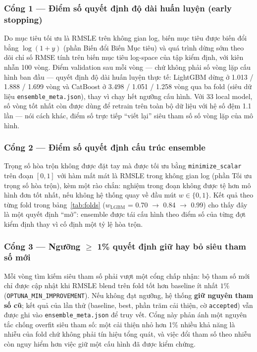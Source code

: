 \documentclass[12pt,a4paper]{report}
\begin{document}
\subsubsection{Cổng 1 --- Điểm số quyết định độ dài huấn luyện (early stopping)}
Do mục tiêu tối ưu là RMSLE trên không gian log, biến mục tiêu được biến đổi bằng
$\log(1+y)$ (phần Biến đổi Biến Mục tiêu) và quá trình dừng sớm theo dõi chỉ số RMSE
tính trên biến mục tiêu log-space của tập kiểm định, với kiên nhẫn 100 vòng. Điểm
validation sau mỗi vòng --- chứ không phải số vòng lặp cấu hình ban đầu --- quyết định
độ dài huấn luyện thực tế: LightGBM dừng ở 1.013 / 1.888 / 1.699 vòng và CatBoost ở
3.498 / 1.051 / 1.258 vòng qua ba fold (siêu dữ liệu \texttt{ensemble\_meta.json}), thay
vì chạy hết ngưỡng cấu hình. Với 33 local model, số vòng tốt nhất còn được dùng để
retrain trên toàn bộ dữ liệu với hệ số đệm 1.1 lần --- nói cách khác, điểm số trực tiếp
``viết lại'' siêu tham số số vòng lặp của mô hình.

\subsubsection{Cổng 2 --- Điểm số quyết định cấu trúc ensemble}
Trọng số hòa trộn không được đặt tay mà được tối ưu bằng \texttt{minimize\_scalar}
trên đoạn $[0, 1]$ với hàm mất mát là RMSLE trong không gian log (phần Tối ưu trọng số
hòa trộn), kèm một rào chắn: nghiệm trong đoạn không được tệ hơn mô hình đơn tốt nhất,
nếu không hệ thống quay về đầu mút $w \in \{0, 1\}$. Kết quả theo từng fold trong
bảng~\ref{tab:folds} ($w_{\mathrm{LGBM}}$ = 0.70 $\rightarrow$ 0.84 $\rightarrow$ 0.99)
cho thấy đây là một quyết định ``mở'': ensemble được tái cấu hình theo điểm số của từng
đợt kiểm định thay vì cố định một tỷ lệ hòa trộn.

\subsubsection{Cổng 3 --- Ngưỡng $\geq$ 1\% quyết định giữ hay bỏ siêu tham số mới}
Mỗi vòng tìm kiếm siêu tham số phải vượt một cổng chấp nhận: bộ tham số mới chỉ được
cập nhật khi RMSLE blend trên fold tốt hơn baseline ít nhất $1\%$
(\texttt{OPTUNA\_MIN\_IMPROVEMENT}). Nếu không đạt ngưỡng, hệ thống \textbf{giữ nguyên
tham số cũ}; kết quả của lần thử (baseline, best, phần trăm cải thiện, cờ
\texttt{accepted}) vẫn được ghi vào \texttt{ensemble\_meta.json} để truy vết. Cổng này
phản ánh một nguyên tắc chống overfit siêu tham số: một cải thiện nhỏ hơn 1\% nhiều
khả năng là nhiễu của fold chứ không phải tín hiệu tổng quát, và việc đổi tham số theo
nhiễu còn nguy hiểm hơn việc giữ một cấu hình đã được kiểm chứng.
\end{document}

